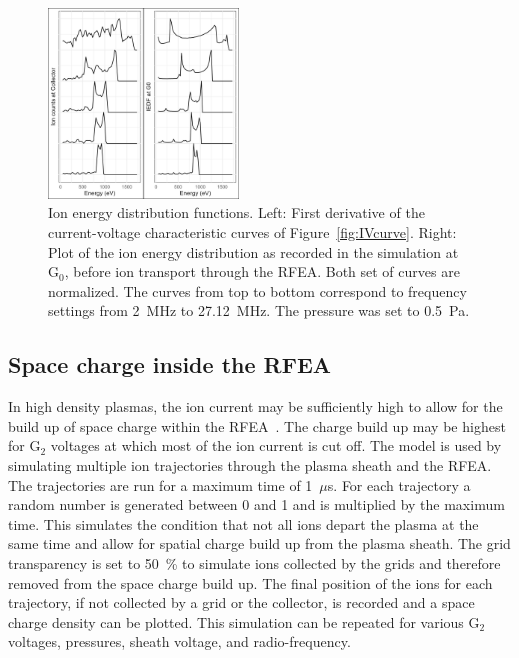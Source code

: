 \begin{figure}[htbp]
\centering
\includegraphics[width=0.45\textwidth]{Figures/FrequencyScan.jpeg}
\caption{Ion energy distribution functions. Left: First derivative of the current-voltage characteristic curves of Figure~\ref{fig:IVcurve}. Right: Plot of the ion energy distribution as recorded in the simulation at G$_0$, before ion transport through the RFEA. Both set of curves are normalized. The curves from top to bottom correspond to frequency settings from 2~MHz to 27.12~MHz. The pressure was set to 0.5~Pa.}
\label{fig:FrequencyScan}
\end{figure}





\subsection{Space charge inside the RFEA}
In high density plasmas, the ion current may be sufficiently high to allow for the build up of space charge within the RFEA~\cite{Hutchinson1987}. The charge build up may be highest for G$_2$ voltages at which most of the ion current is cut off. The model is used by simulating multiple ion trajectories through the plasma sheath and the RFEA. The trajectories are run for a maximum time of 1~$\mu$s. For each trajectory a random number is generated between 0 and 1 and is multiplied by the maximum time. This simulates the condition that not all ions depart the plasma at the same time and allow for spatial charge build up from the plasma sheath. The grid transparency is set to 50~\% to simulate ions collected by the grids and therefore removed from the space charge build up. The final position of the ions for each trajectory, if not collected by a grid or the collector, is recorded and a space charge density can be plotted. This simulation can be repeated for various G$_2$ voltages, pressures, sheath voltage, and radio-frequency.  






